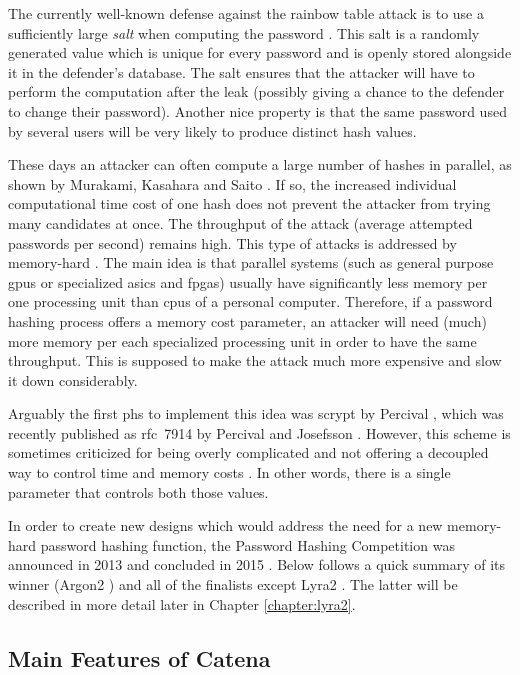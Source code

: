 The currently well-known defense against the rainbow table attack is to use a sufficiently large \emph{salt} when computing the password \cite{marcos:2015:lyra2}. This salt is a randomly generated value which is unique for every password and is openly stored alongside it in the defender's database. The salt ensures that the attacker will have to perform the computation after the leak (possibly giving a chance to the defender to change their password). Another nice property is that the same password used by several users will be very likely to produce distinct hash values.

These days an attacker can often compute a large number of hashes in parallel, as shown by Murakami, Kasahara and Saito \cite{5665047}. If so, the increased individual computational time cost of one hash does not prevent the attacker from trying many candidates at once. The throughput of the attack (average attempted passwords per second) remains high. This type of attacks is addressed by memory-hard . The main idea is that parallel systems (such as general purpose \glspl{gpu} or specialized \glspl{asic} and \glspl{fpga}) usually have significantly less memory per one processing unit than \glspl{cpu} of a personal computer. Therefore, if a password hashing process offers a memory cost parameter, an attacker will need (much) more memory per each specialized processing unit in order to have the same throughput. This is supposed to make the attack much more expensive and slow it down considerably.

Arguably the first \gls{phs} to implement this idea was scrypt by Percival \cite{percival:2016:scrypt}, which was recently published as \mbox{\gls{rfc} 7914} by Percival and Josefsson \cite{rfc7914}. However, this scheme is sometimes criticized for being overly complicated and not offering a decoupled way to control time and memory costs \cite{marcos:2015:lyra2}. In other words, there is a single parameter that controls both those values.

In order to create new designs which would address the need for a new memory-hard password hashing function, the Password Hashing Competition was announced in 2013 and concluded in 2015 \cite{wetzels:2016:phc}. Below follows a quick summary of its winner (Argon2 \cite{biryukov:2015:argon2}) and all of the finalists except Lyra2 \cite{andrade:2016:lyra2}. The latter will be described in more detail later in Chapter \ref{chapter:lyra2}.

\subsection{Main Features of Catena}
\label{sec:catena}

